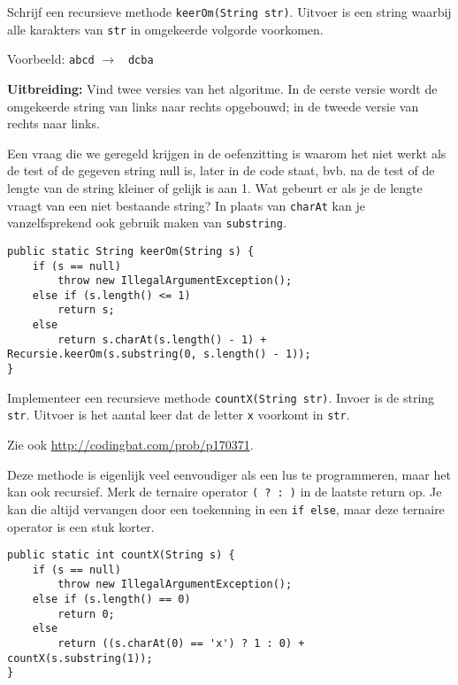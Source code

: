 \begin{oef}
\code Schrijf een recursieve methode \verb/keerOm(String str)/. Uitvoer is een string waarbij alle karakters van \verb/str/ in omgekeerde volgorde voorkomen.

Voorbeeld: \verb/abcd/ $\rightarrow$ \verb/ dcba/

{\textbf{Uitbreiding:}} Vind twee versies van het algoritme. In de eerste versie wordt de omgekeerde string van links naar rechts opgebouwd; in de tweede versie van rechts naar links.
\begin{opl}
Een vraag die we geregeld krijgen in de oefenzitting is waarom het niet werkt als de test of de gegeven string null is, later in de code staat, bvb. na de test of de lengte van de string kleiner of gelijk is aan 1. Wat gebeurt er als je de lengte vraagt van een niet bestaande string? In plaats van \verb+charAt+ kan je vanzelfsprekend ook gebruik maken van \verb+substring+. 
\begin{lstlisting}[caption={Recursieve methode om een string om te keren}, label=reckeerom]
public static String keerOm(String s) {
	if (s == null)
		throw new IllegalArgumentException();
	else if (s.length() <= 1)
		return s;
	else
		return s.charAt(s.length() - 1) + Recursie.keerOm(s.substring(0, s.length() - 1));
}
\end{lstlisting}
\end{opl}

\end{oef}

\begin{oef}
\code Implementeer een recursieve methode \verb/countX(String str)/. Invoer is de string \verb/str/. Uitvoer is het aantal keer dat de letter \verb/x/ voorkomt in \verb/str/.

Zie ook \url{http://codingbat.com/prob/p170371}.
\begin{opl}
Deze methode is eigenlijk veel eenvoudiger als een lus te programmeren, maar het kan ook recursief. Merk de ternaire operator \verb+( ? : )+ in de laatste return op. Je kan die altijd vervangen door een toekenning in een \verb+if else+, maar deze ternaire operator is een stuk korter.
\begin{lstlisting}[caption={Recursieve methode om het aantal keer te tellen dat de letter x in een string voorkomt}, label=reccountx]
public static int countX(String s) {
	if (s == null)
		throw new IllegalArgumentException();
	else if (s.length() == 0)
		return 0;
	else
		return ((s.charAt(0) == 'x') ? 1 : 0) + countX(s.substring(1));
}
\end{lstlisting}

\end{opl}

\end{oef}





